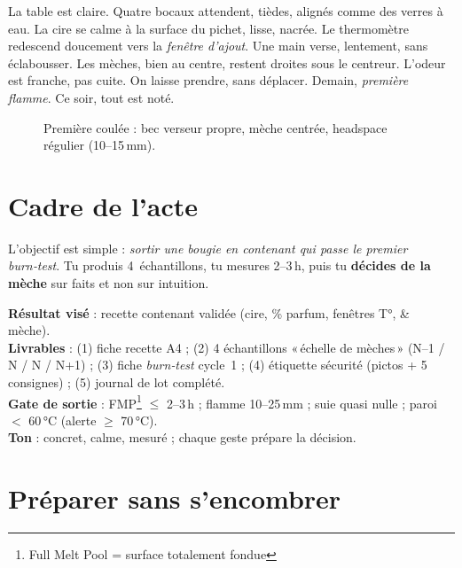 \documentclass[../../main.tex]{subfiles}
\begin{document}
La table est claire. Quatre bocaux attendent, tièdes, alignés comme des verres à eau. La cire se calme à la surface du pichet, lisse, nacrée. Le thermomètre redescend doucement vers la \textit{fenêtre d’ajout}. Une main verse, lentement, sans éclabousser. Les mèches, bien au centre, restent droites sous le centreur. L’odeur est franche, pas cuite. On laisse prendre, sans déplacer. Demain, \textit{première flamme}. Ce soir, tout est noté.

\begin{figure}[!h]
  \centering
  \fbox{\rule{0pt}{0.36\textheight}\rule{0.9\textwidth}{0pt}}
  \caption{Première coulée : bec verseur propre, mèche centrée, headspace régulier (10--15\,mm).}
\end{figure}

\section{Cadre de l'acte}

L’objectif est simple : \textit{sortir une bougie en contenant qui passe le premier burn‑test}. Tu produis 4~échantillons, tu mesures 2--3\,h, puis tu \textbf{décides de la mèche} sur faits et non sur intuition.

\begin{BlocObjectif}
\textbf{Résultat visé} : recette contenant validée (cire, \% parfum, fenêtres T°, \& mèche). \\
\textbf{Livrables} : (1) fiche recette A4 ; (2) 4 échantillons «\,échelle de mèches\,» (N--1 / N / N / N+1) ; (3) fiche \textit{burn‑test} cycle~1 ; (4) étiquette sécurité (pictos + 5 consignes) ; (5) journal de lot complété. \\
\textbf{Gate de sortie} : FMP\footnote{Full Melt Pool = surface totalement fondue} \(\leq\) 2--3\,h ; flamme 10--25\,mm ; suie quasi nulle ; paroi \(<\) 60\,\si{\celsius} (alerte \(\geq\) 70\,\si{\celsius}). \\
\textbf{Ton} : concret, calme, mesuré ; chaque geste prépare la décision.
\end{BlocObjectif}

\section{Préparer sans s’encombrer}
\end{document}
